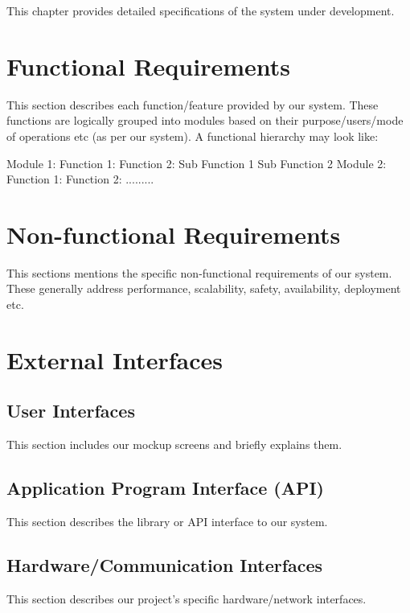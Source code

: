 This chapter provides detailed specifications of the system under development.

\section{Functional Requirements}

This section describes each function/feature provided by our system. These functions are logically grouped into modules based on their purpose/users/mode of operations etc (as per our system). A functional hierarchy may look like:
\begin{outline}
  \1 Module 1:
  \2 Function 1:
  \2 Function 2:
  \3 Sub Function 1
  \3 Sub Function 2
  \1 Module 2:
  \2 Function 1:
  \2 Function 2:
  \1 .........
\end{outline}


\section{Non-functional Requirements}

This sections mentions the specific non-functional requirements of our system. These generally address performance, scalability, safety, availability, deployment etc.

\section{External Interfaces}

\subsection{User Interfaces}
This section includes our mockup screens and briefly explains them.

\subsection{Application Program Interface (API)}
This section describes the library or API interface to our system.

\subsection{Hardware/Communication Interfaces}
This section describes our project's specific hardware/network interfaces.

